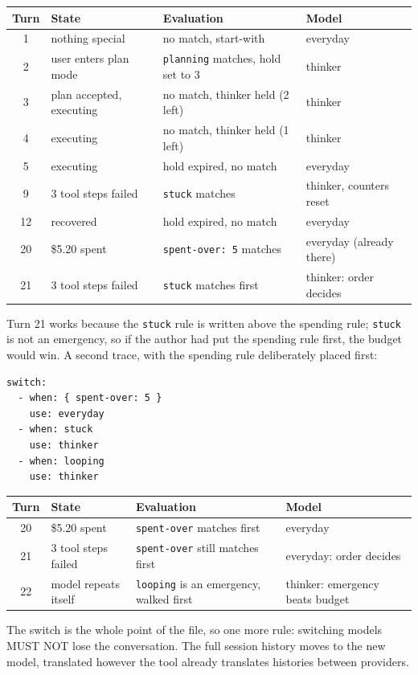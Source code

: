 \documentclass[11pt]{article}
\newcommand{\key}[1]{\texttt{#1}}
\begin{document}
\begin{tabularx}{\textwidth}{@{}clXl@{}}
\toprule
Turn & State & Evaluation & Model \\
\midrule
1 & nothing special & no match, start-with & everyday \\
2 & user enters plan mode & \key{planning} matches, hold set to 3 & thinker \\
3 & plan accepted, executing & no match, thinker held (2 left) & thinker \\
4 & executing & no match, thinker held (1 left) & thinker \\
5 & executing & hold expired, no match & everyday \\
9 & 3 tool steps failed & \key{stuck} matches & thinker, counters reset \\
12 & recovered & hold expired, no match & everyday \\
20 & \$5.20 spent & \key{spent-over: 5} matches & everyday (already there) \\
21 & 3 tool steps failed & \key{stuck} matches first & thinker: order decides \\
\bottomrule
\end{tabularx}

\medskip
Turn 21 works because the \key{stuck} rule is written above the spending
rule; \key{stuck} is not an emergency, so if the author had put the
spending rule first, the budget would win. A second trace, with the
spending rule deliberately placed first:

\begin{lstlisting}
switch:
  - when: { spent-over: 5 }
    use: everyday
  - when: stuck
    use: thinker
  - when: looping
    use: thinker
\end{lstlisting}

\begin{tabularx}{\textwidth}{@{}clXl@{}}
\toprule
Turn & State & Evaluation & Model \\
\midrule
20 & \$5.20 spent & \key{spent-over} matches first & everyday \\
21 & 3 tool steps failed & \key{spent-over} still matches first & everyday: order decides \\
22 & model repeats itself & \key{looping} is an emergency, walked first & thinker: emergency beats budget \\
\bottomrule
\end{tabularx}

\medskip
The switch is the whole point of the file, so one more rule: switching
models MUST NOT lose the conversation. The full session history moves to
the new model, translated however the tool already translates histories
between providers.
\end{document}
